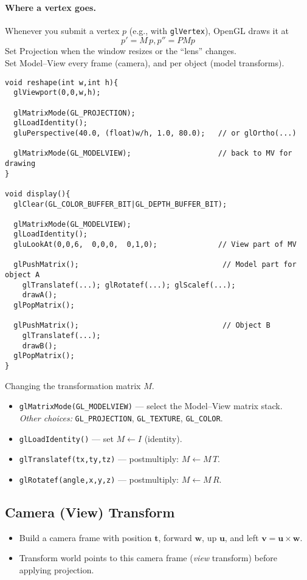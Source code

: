 \documentclass[8pt,twocolumn]{extarticle}
\begin{document}
  \paragraph{Where a vertex goes.}
  Whenever you submit a vertex \(p\) (e.g., with \verb|glVertex|), OpenGL draws it at
  \[
  p' = M\,p, p'' = PMp
  \]
  Set Projection when the window resizes or the “lens” changes.\\
Set Model–View every frame (camera), and per object (model transforms).
  \begin{lstlisting}
void reshape(int w,int h){
  glViewport(0,0,w,h);

  glMatrixMode(GL_PROJECTION);
  glLoadIdentity();
  gluPerspective(40.0, (float)w/h, 1.0, 80.0);   // or glOrtho(...)

  glMatrixMode(GL_MODELVIEW);                    // back to MV for drawing
}

void display(){
  glClear(GL_COLOR_BUFFER_BIT|GL_DEPTH_BUFFER_BIT);

  glMatrixMode(GL_MODELVIEW);
  glLoadIdentity();
  gluLookAt(0,0,6,  0,0,0,  0,1,0);              // View part of MV

  glPushMatrix();                                 // Model part for object A
    glTranslatef(...); glRotatef(...); glScalef(...);
    drawA();
  glPopMatrix();

  glPushMatrix();                                 // Object B
    glTranslatef(...);
    drawB();
  glPopMatrix();
}
\end{lstlisting}
Changing the transformation matrix \(M\).
  \begin{itemize}
    \item \verb|glMatrixMode(GL_MODELVIEW)| — select the Model--View matrix stack.\\
          \emph{Other choices:} \verb|GL_PROJECTION|, \verb|GL_TEXTURE|, \verb|GL_COLOR|.
    \item \verb|glLoadIdentity()| — set \(M \leftarrow I\) (identity).
    \item \verb|glTranslatef(tx,ty,tz)| — postmultiply: \(M \leftarrow M\,T\).
    \item \verb|glRotatef(angle,x,y,z)| — postmultiply: \(M \leftarrow M\,R\).
  \end{itemize}
  
\subsection*{Camera (View) Transform}
\begin{itemize}
  \item Build a camera frame with position \(\mathbf{t}\), forward \(\mathbf{w}\), up \(\mathbf{u}\), and left \(\mathbf{v}=\mathbf{u}\times\mathbf{w}\).
  \item Transform world points to this camera frame (\emph{view} transform) before applying projection.
\end{itemize}
\end{document}

